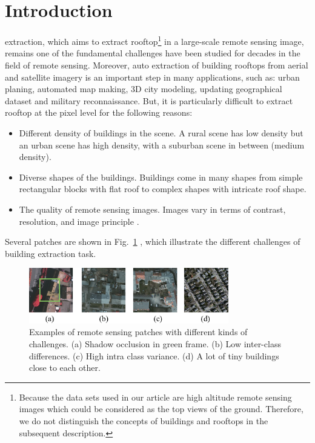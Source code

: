 %
\section{Introduction}
\label{sec:intro}



 extraction, which aims to extract rooftop\footnote{Because the data sets used in our article are high altitude remote sensing images which could be considered as the top views of the ground. Therefore, we do not distinguish the concepts of buildings and rooftops in the subsequent description.} in a large-scale remote sensing image, remains one of the fundamental challenges have been studied for decades in the field of remote sensing. Moreover, auto extraction of building rooftops from aerial and satellite imagery is an important step in many applications, such as: urban planing, automated map making, 3D city modeling, updating geographical dataset and military reconnaissance. But, it is particularly difficult to extract rooftop at the pixel level for the following reasons:
\begin{itemize}
 \item Different density of buildings in the scene. A rural scene has low density but an urban scene has high density, with a suburban scene in between (medium density).
 \item Diverse shapes of the buildings. Buildings come in many shapes from simple rectangular blocks with flat roof to complex shapes with intricate roof shape.
 \item The quality of remote sensing images. Images vary in terms of contrast, resolution, and image principle \cite{IEEEexample:huertas1988detecting}.
\end{itemize}

 Several patches are shown in Fig.~\ref{fig:intro}  , which illustrate the different challenges of building extraction task.


\begin{figure}
\setlength{\abovecaptionskip}{-0cm}
\setlength{\belowcaptionskip}{-2cm} 
\includegraphics[width=8.7cm]{Figures/challenge.eps}
\caption{Examples of remote sensing patches with different kinds of challenges. (a) Shadow occlusion in green frame. (b) Low inter-class differences. (c) High intra class variance. (d) A lot of tiny buildings close to each other.}
\label{fig:intro}
\end{figure}


